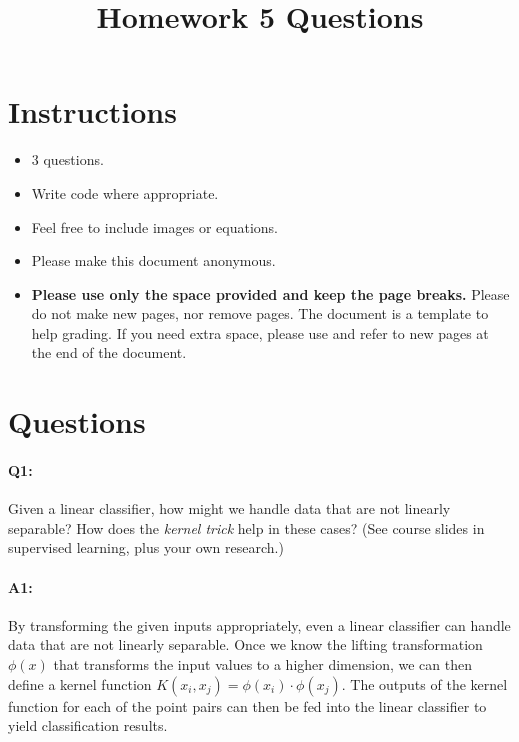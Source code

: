 \date{}

\title{\vspace{-1.5cm}Homework 5 Questions}



\maketitle
\vspace{-3cm}
\thispagestyle{fancy}

\section*{Instructions}
\begin{itemize}
  \item 3 questions.
  \item Write code where appropriate.
  \item Feel free to include images or equations.
  \item Please make this document anonymous.
  \item \textbf{Please use only the space provided and keep the page breaks.} Please do not make new pages, nor remove pages. The document is a template to help grading. If you need extra space, please use and refer to new pages at the end of the document.
\end{itemize}

\section*{Questions}

\paragraph{Q1:} Given a linear classifier, how might we handle data that are not linearly separable? How does the \emph{kernel trick} help in these cases? (See course slides in supervised learning, plus your own research.)

\paragraph{A1:} By transforming the given inputs appropriately, even a linear classifier can handle data that are not linearly separable. Once we know the lifting transformation $\phi(x)$ that transforms the input values to a higher dimension, we can then define a kernel function $K(x_i, x_j) = \phi(x_i)\cdot\phi(x_j)$. The outputs of the kernel function for each of the point pairs can then be fed into the linear classifier to yield classification results.

